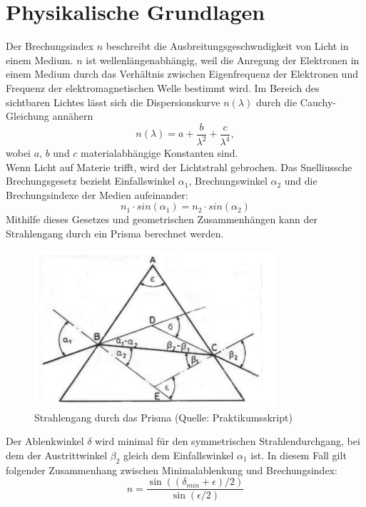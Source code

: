 \documentclass[12pt,a4paper]{article}
\begin{document}
\section{Physikalische Grundlagen}
Der Brechungsindex $n$ beschreibt die Ausbreitungsgeschwndigkeit von Licht in einem Medium. $n$ ist wellenlängenabhängig, weil die Anregung der Elektronen in einem Medium durch das Verhältnis zwischen Eigenfrequenz der Elektronen und Frequenz der elektromagnetischen Welle bestimmt wird. Im Bereich des sichtbaren Lichtes lässt sich die Dispersionskurve $n(\lambda)$ durch die Cauchy-Gleichung annähern
\begin{equation}\label{eq:Cauchy-Gleichung}
n(\lambda)=a+\frac{b}{\lambda^2}+\frac{c}{\lambda^4},
\end{equation}
wobei $a$, $b$ und $c$ materialabhängige Konstanten sind.\\
Wenn Licht auf Materie trifft, wird der Lichtstrahl gebrochen. Das Snelliussche Brechungsgesetz bezieht Einfallswinkel $\alpha_1$, Brechungswinkel $\alpha_2$ und die Brechungsindexe der Medien aufeinander:
\begin{equation}
n_1 \cdot sin(\alpha_1) = n_2 \cdot sin(\alpha_2)
\end{equation}
Mithilfe dieses Gesetzes und geometrischen Zusammenhängen kann der Strahlengang durch ein Prisma berechnet werden.
\begin{figure}[H]
	\centering
	\includegraphics[width=0.8\textwidth]{Prisma_Strahlengang.png}
	\caption{Strahlengang durch das Prisma (Quelle: Praktikumsskript)}
	\label{Prisma_Strahlengang}
\end{figure}
Der Ablenkwinkel $\delta$ wird minimal für den symmetrischen Strahlendurchgang, bei dem der Austrittwinkel $\beta_2$ gleich dem Einfallswinkel $\alpha_1$ ist. In diesem Fall gilt folgender Zusammenhang zwischen Minimalablenkung und Brechungsindex:
\begin{equation}\label{eq:n_aus_delmin}
n=\frac{\sin((\delta_{min}+\epsilon)/2)}{\sin(\epsilon/2)}
\end{equation}
\end{document}
